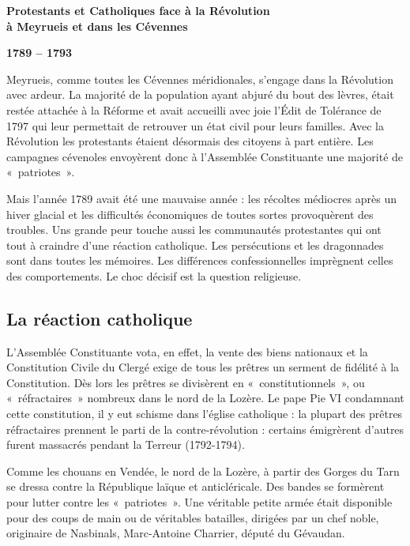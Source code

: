 

{\fontsize{10.15}{11.65}\selectfont


\begin{center}
{\Large\bfseries Protestants et Catholiques face à la Révolution\\
à Meyrueis et dans les Cévennes}

{\bfseries 1789 -- 1793}
\end{center}


Meyrueis, comme toutes les Cévennes méridionales, s’engage dans la Révolution avec ardeur.
La majorité de la population ayant abjuré du bout des lèvres, était restée attachée à la Réforme et avait accueilli avec joie l’Édit de Tolérance de 1797 qui leur permettait de retrouver un état civil pour leurs familles.
Avec la Révolution les protestants étaient désormais des citoyens à part entière. Les campagnes cévenoles envoyèrent donc à l’Assemblée Constituante une majorité de «~patriotes~».

Mais l’année 1789 avait été une mauvaise année : les récoltes médiocres après un hiver glacial et les difficultés économiques de toutes sortes provoquèrent des troubles. Uns grande peur touche aussi les communautés protestantes qui ont tout à craindre d’une réaction catholique.
Les persécutions et les dragonnades sont dans toutes les mémoires.
Les différences confessionnelles imprègnent celles des comportements. Le choc décisif est la question religieuse.


\subsection{La réaction catholique}

L’Assemblée Constituante vota, en effet, la vente des biens nationaux et la Constitution Civile du Clergé exige de tous les prêtres un serment de fidélité à la Constitution. Dès lors les prêtres se divisèrent en «~constitutionnels~», ou «~réfractaires~» nombreux dans le nord de la Lozère.
Le pape Pie VI condamnant cette constitution, il y eut schisme dans l’église catholique : la plupart des prêtres réfractaires prennent le parti de la contre-révolution : certains émigrèrent d’autres furent massacrés pendant la Terreur (1792-1794).

Comme les chouans en Vendée, le nord de la Lozère, à partir des Gorges du Tarn se dressa contre la République laïque et anticléricale. Des bandes se formèrent pour lutter contre les «~patriotes~». Une véritable petite armée était disponible pour des coups de main ou de véritables batailles, dirigées par un chef noble, originaire de Nasbinals, Marc-Antoine Charrier, député du Gévaudan.

}
